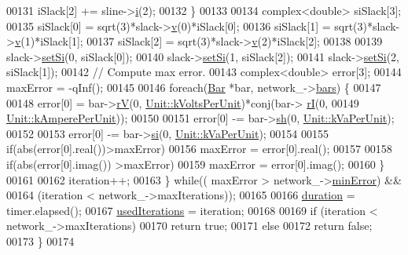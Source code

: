 \begin{DoxyCode}
00131       iSlack[2] += sline->\hyperlink{group___models_gaf81e7055102816465bdf7e19afc2d547}{i}(2);
00132     \}
00133 
00134     complex<double> siSlack[3];
00135     siSlack[0] = sqrt(3)*slack->\hyperlink{group___models_ga1e6f2daec86407118656d88170d1adc2}{v}(0)*iSlack[0];
00136     siSlack[1] = sqrt(3)*slack->\hyperlink{group___models_ga1e6f2daec86407118656d88170d1adc2}{v}(1)*iSlack[1];
00137     siSlack[2] = sqrt(3)*slack->\hyperlink{group___models_ga1e6f2daec86407118656d88170d1adc2}{v}(2)*iSlack[2];
00138 
00139     slack->\hyperlink{group___models_ga74e510be49e50e4c14550b32e1dc92f9}{setSi}(0, siSlack[0]);
00140     slack->\hyperlink{group___models_ga74e510be49e50e4c14550b32e1dc92f9}{setSi}(1, siSlack[2]);
00141     slack->\hyperlink{group___models_ga74e510be49e50e4c14550b32e1dc92f9}{setSi}(2, siSlack[1]);
00142     \textcolor{comment}{// Compute max error.}
00143     complex<double> error[3];
00144     maxError = -qInf();
00145 
00146     \textcolor{keywordflow}{foreach}(\hyperlink{class_bar}{Bar} *bar, network\_->\hyperlink{class_network_a7fe628f7de34a96235cbd3f2cee4aff2}{bars}) \{
00147 
00148       error[0] = bar->\hyperlink{group___models_ga2d1f6bfbd8abaf168bb75bd8e5cd9b5e}{rV}(0, \hyperlink{class_unit_a55b07dfa9457e1eca2c7194fe0cfc3c1ab44b1310b59fdcdc9df5bbea91da4206}{Unit::kVoltsPerUnit})*conj(bar->
      \hyperlink{group___models_ga8a009531f01430aa68eba739bb0dc2ea}{rI}(0,
00149                  \hyperlink{class_unit_a0794cf6c9682f48296dd4a5315389787aeed3b50e464d581cb630181a3b6a0709}{Unit::kAmperePerUnit}));
00150 
00151       error[0] -= bar->\hyperlink{group___models_gac188071bf5f165b0acdaa4c8af82355c}{sh}(0, \hyperlink{class_unit_ace265ae255370ccacfd5370337572c3bae056e80d620a87c61a44c359e6b05cc1}{Unit::kVaPerUnit});
00152 
00153       error[0] -= bar->\hyperlink{group___models_ga02bbc279f1e133f66b12ee21e7bebcd8}{si}(0, \hyperlink{class_unit_ace265ae255370ccacfd5370337572c3bae056e80d620a87c61a44c359e6b05cc1}{Unit::kVaPerUnit});
00154 
00155       \textcolor{keywordflow}{if}(abs(error[0].real())>maxError)
00156         maxError = error[0].real();
00157 
00158       \textcolor{keywordflow}{if}(abs(error[0].imag()) >maxError)
00159         maxError = error[0].imag();
00160     \}
00161 
00162     iteration++;
00163   \} \textcolor{keywordflow}{while}(( maxError > network\_->\hyperlink{group___graphics_gabcdc973129d3dda7572b7a1c388da1b5}{minError}) &&
00164           (iteration < network\_->maxIterations));
00165 
00166   \hyperlink{class_shirmoharmmadi_a32ab19ff485833106bf68cd91dbc94e6}{duration} = timer.elapsed();
00167   \hyperlink{class_shirmoharmmadi_afdd22da0145b033c47f4f8a6bbd37d0d}{usedIterations} = iteration;
00168 
00169   \textcolor{keywordflow}{if} (iteration < network\_->maxIterations)
00170     \textcolor{keywordflow}{return} \textcolor{keyword}{true};
00171   \textcolor{keywordflow}{else}
00172     \textcolor{keywordflow}{return} \textcolor{keyword}{false};
00173 \}
00174 
\end{DoxyCode}
